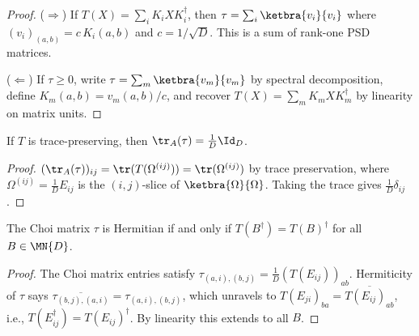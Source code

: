 \begin{proof}
    \leanok
    ($\Rightarrow$) If $T(X) = \sum_i K_i X K_i^\dagger$, then
    $\tau = \sum_i \ketbra{v_i}{v_i}$ where
    $(v_i)_{(a,b)} = c\,K_i(a,b)$ and $c = 1/\sqrt{D}$.
    This is a sum of rank-one PSD matrices.

    ($\Leftarrow$) If $\tau \ge 0$, write
    $\tau = \sum_m \ketbra{v_m}{v_m}$
    by spectral decomposition, define $K_m(a,b) = v_m(a,b)/c$,
    and recover $T(X) = \sum_m K_m X K_m^\dagger$ by linearity on
    matrix units.
\end{proof}

\begin{theorem}\label{thm:traceLeft_choiMatrix_of_tp}
    \leanok
    If $T$ is trace-preserving, then
    $\tr_A(\tau) = \frac{1}{D} \Id_D$.
\end{theorem}

\begin{proof}
    \leanok
    $(\tr_A(\tau))_{ij}
        = \tr(T(\Omega^{(ij)}))
        = \tr(\Omega^{(ij)})$
    by trace preservation, where
    $\Omega^{(ij)} = \frac{1}{D} E_{ij}$ is the $(i,j)$-slice of
    $\ketbra{\Omega}{\Omega}$.
    Taking the trace gives $\frac{1}{D}\delta_{ij}$.
\end{proof}

\begin{theorem}\label{thm:choiMatrix_isHermitian_iff_hermiticityPreserving}
    \leanok
    The Choi matrix $\tau$ is Hermitian if and only if
    $T(B^\dagger) = T(B)^\dagger$ for all $B \in \MN{D}$.
\end{theorem}

\begin{proof}
    \leanok
    The Choi matrix entries satisfy
    $\tau_{(a,i),(b,j)} = \frac{1}{D}(T(E_{ij}))_{ab}$.
    Hermiticity of $\tau$ says
    $\overline{\tau_{(b,j),(a,i)}} = \tau_{(a,i),(b,j)}$, which
    unravels to $T(E_{ji})_{ba} = \overline{T(E_{ij})_{ab}}$, i.e.,
    $T(E_{ij}^\dagger) = T(E_{ij})^\dagger$.
    By linearity this extends to all $B$.
\end{proof}

